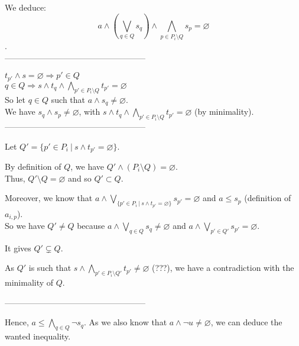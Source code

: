 \documentclass[a4paper]{article}%
\newcommand{\alt}{~|~}
\begin{document}
    We deduce:
    \[a \land (\bigvee_{q\in Q} s_q) \land \bigwedge_{p \in P_i\setminus Q} s_p = \varnothing\].\\

    ---------------------------------------------------

    $t_{p'} \land s = \varnothing \Rightarrow p' \in Q$\\
    $q \in Q \Rightarrow  s \land t_q \land \bigwedge_{p' \in P_i\setminus Q} t_{p'} = \varnothing$\\

    So let $q \in Q$ such that $a \land s_q \neq \varnothing$.\\
    We have $s_q \land s_p \neq \varnothing$, with $s \land t_q \land \bigwedge_{p' \in P_i\setminus Q} t_{p'} = \varnothing$ (by minimality).\\

    ---------------------------------------------------

    Let $Q' = \{p'\in P_i\alt s\wedge t_{p'}=\varnothing\}$.

    By definition of $Q$, we have $Q' \land (P_i \setminus Q) = \varnothing$.\\
    Thus, $Q' \setminus Q = \varnothing$ and so $Q' \subset Q$.

    Moreover, we know that $a \land \bigvee_{\{p'\in P_i\alt s\wedge t_{p'}=\varnothing\}} s_{p'} = \varnothing$ and $a \leq s_p$ (definition of $a_{i,p}$).\\
    So we have $Q' \neq Q$ because $a \land \bigvee_{q\in Q} s_q \neq \varnothing$ and $a \land \bigvee_{p'\in Q'} s_{p'} = \varnothing$.

    It gives $Q' \subsetneq Q$.

    As $Q'$ is such that $s \land \bigwedge_{p' \in P_i\setminus Q'} t_{p'} \neq \varnothing$ (???), we have a contradiction with the minimality of $Q$.

    ---------------------------------------------------

    Hence, $a \leq \bigwedge_{q\in Q} \neg s_q$. As we also know that $a \land \neg u \neq \varnothing$, we can deduce the wanted inequality.
\end{document}
